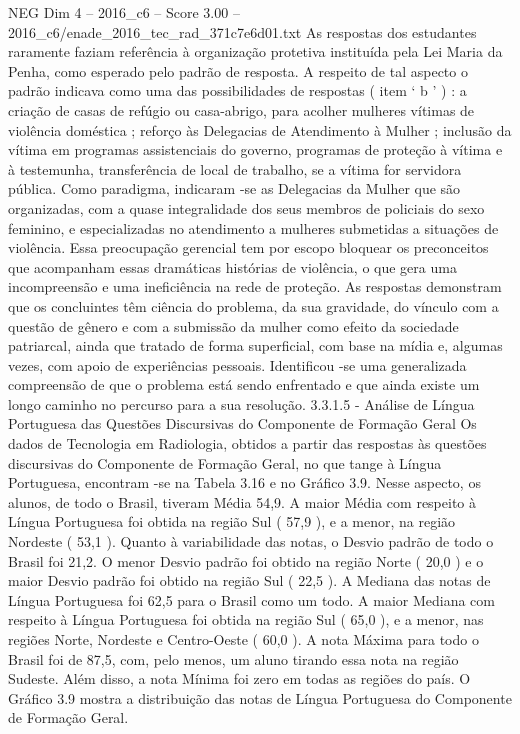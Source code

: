\begin{textsample}{NEG Dim 4 – 2016\_c6 – Score 3.00 – 2016\_c6/enade\_2016\_tec\_rad\_371c7e6d01.txt}
As respostas dos estudantes raramente faziam referência à organização protetiva instituída pela Lei Maria da Penha, como esperado pelo padrão de resposta.
A respeito de tal aspecto o padrão indicava como uma das possibilidades de respostas ( item ‘ b ’ ) : a criação de casas de refúgio ou casa-abrigo, para acolher mulheres vítimas de violência doméstica ; reforço às Delegacias de Atendimento à Mulher ; inclusão da vítima em programas assistenciais do governo, programas de proteção à vítima e à testemunha, transferência de local de trabalho, se a vítima for servidora pública.
Como paradigma, indicaram -se as Delegacias da Mulher que são organizadas, com a quase integralidade dos seus membros de policiais do sexo feminino, e especializadas no atendimento a mulheres submetidas a situações de violência.
Essa preocupação gerencial tem por escopo bloquear os preconceitos que acompanham essas dramáticas histórias de violência, o que gera uma incompreensão e uma ineficiência na rede de proteção.
As respostas demonstram que os concluintes têm ciência do problema, da sua gravidade, do vínculo com a questão de gênero e com a submissão da mulher como efeito da sociedade patriarcal, ainda que tratado de forma superficial, com base na mídia e, algumas vezes, com apoio de experiências pessoais.
Identificou -se uma generalizada compreensão de que o problema está sendo enfrentado e que ainda existe um longo caminho no percurso para a sua resolução. 3.3.1.5 - Análise de Língua Portuguesa das Questões Discursivas do Componente de Formação Geral Os dados de Tecnologia em Radiologia, obtidos a partir das respostas às questões discursivas do Componente de Formação Geral, no que tange à Língua Portuguesa, encontram -se na Tabela 3.16 e no Gráfico 3.9.
Nesse aspecto, os alunos, de todo o Brasil, tiveram Média 54,9.
A maior Média com respeito à Língua Portuguesa foi obtida na região Sul ( 57,9 ), e a menor, na região Nordeste ( 53,1 ).
Quanto à variabilidade das notas, o Desvio padrão de todo o Brasil foi 21,2.
O menor Desvio padrão foi obtido na região Norte ( 20,0 ) e o maior Desvio padrão foi obtido na região Sul ( 22,5 ).
A Mediana das notas de Língua Portuguesa foi 62,5 para o Brasil como um todo.
A maior Mediana com respeito à Língua Portuguesa foi obtida na região Sul ( 65,0 ), e a menor, nas regiões Norte, Nordeste e Centro-Oeste ( 60,0 ).
A nota Máxima para todo o Brasil foi de 87,5, com, pelo menos, um aluno tirando essa nota na região Sudeste.
Além disso, a nota Mínima foi zero em todas as regiões do país.
O Gráfico 3.9 mostra a distribuição das notas de Língua Portuguesa do Componente de Formação Geral.

\end{textsample}

